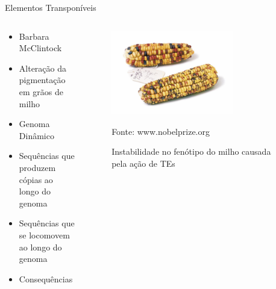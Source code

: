 \documentclass[%
  xcolor=table,%
  10pt,%
  aspectratio = 169,%
  compress,%
  t,%
]{beamer}%
\begin{document}
\begin{frame}{}{Elementos Transponíveis}
    \begin{columns}
        \begin{column}{0.5\textwidth}
            \begin{itemize}
                \item Barbara McClintock
                \item Alteração da pigmentação em grãos de milho
                \item Genoma Dinâmico
                \item Sequências que produzem cópias ao longo do genoma
                \item Sequências que se locomovem ao longo do genoma
                \item Consequências
            \end{itemize}       
        \end{column}
        \begin{column}{0.5\textwidth}  %
            \begin{center}
                \begin{figure}
                    \centering
                    \includegraphics[width = 0.7\textwidth]{./Figuras/te-maize.jpg}
                    \caption{Instabilidade no fenótipo do milho causada pela ação de TEs}
                    \scriptsize Fonte: www.nobelprize.org %
                    \label{fig:maize-phenotype-instability}
                \end{figure}
             \end{center}
        \end{column}
    \end{columns}
\end{frame}
\end{document}
